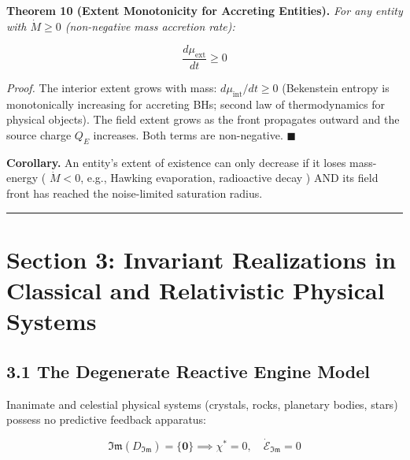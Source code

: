 \documentclass[11pt,a4paper]{article}
\theoremstyle{definition}\newtheorem{definition}{Definition}
\theoremstyle{remark}\newtheorem{remark}{Remark}
\begin{document}
\textbf{Theorem 10 (Extent Monotonicity for Accreting Entities).} \textit{For any entity with $\dot{M} \geq 0$ (non-negative mass accretion rate):}


\begin{equation}
\frac{d\mu_{\text{ext}}}{dt} \geq 0
\end{equation}


\textit{Proof.} The interior extent grows with mass: $d\mu_{\text{int}}/dt \geq 0$ (Bekenstein entropy is monotonically increasing for accreting BHs; second law of thermodynamics for physical objects). The field extent grows as the front propagates outward and the source charge $Q_E$ increases. Both terms are non-negative. $\blacksquare$

\textbf{Corollary.} An entity's extent of existence can only decrease if it loses mass-energy ( $\dot{M} < 0$, e.g., Hawking evaporation, radioactive decay ) AND its field front has reached the noise-limited saturation radius.

\noindent\rule{\linewidth}{0.4pt}
\section{Section 3: Invariant Realizations in Classical and Relativistic Physical Systems}
\subsection{3.1 The Degenerate Reactive Engine Model}

Inanimate and celestial physical systems (crystals, rocks, planetary bodies, stars) possess no predictive feedback apparatus:


\begin{equation}
\mathfrak{Im}(D_{\mathfrak{Im}}) = \{\mathbf{0}\} \implies \chi^* = 0, \quad \dot{\mathcal{E}}_{\mathfrak{Im}} = 0
\end{equation}
\end{document}
